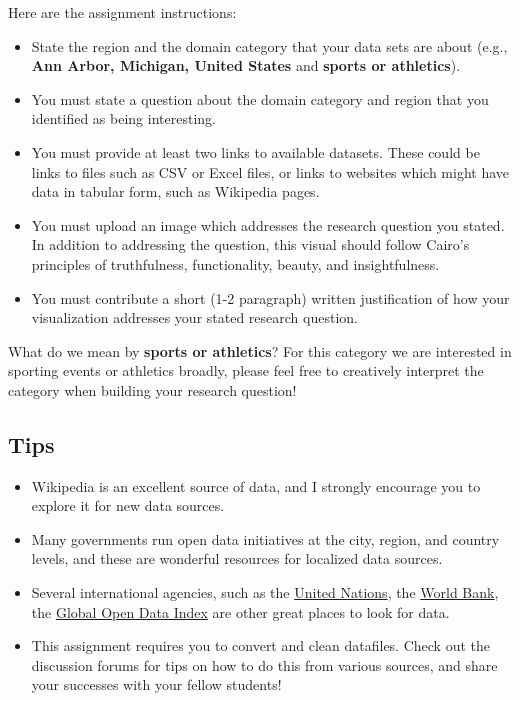 \documentclass[11pt]{article}
\providecommand{\tightlist}{%
      \setlength{\itemsep}{0pt}\setlength{\parskip}{0pt}}
\begin{document}
Here are the assignment instructions:

\begin{itemize}
\tightlist
\item
  State the region and the domain category that your data sets are about
  (e.g., \textbf{Ann Arbor, Michigan, United States} and \textbf{sports
  or athletics}).
\item
  You must state a question about the domain category and region that
  you identified as being interesting.
\item
  You must provide at least two links to available datasets. These could
  be links to files such as CSV or Excel files, or links to websites
  which might have data in tabular form, such as Wikipedia pages.
\item
  You must upload an image which addresses the research question you
  stated. In addition to addressing the question, this visual should
  follow Cairo's principles of truthfulness, functionality, beauty, and
  insightfulness.
\item
  You must contribute a short (1-2 paragraph) written justification of
  how your visualization addresses your stated research question.
\end{itemize}

What do we mean by \textbf{sports or athletics}? For this category we
are interested in sporting events or athletics broadly, please feel free
to creatively interpret the category when building your research
question!

\subsection{Tips}\label{tips}

\begin{itemize}
\tightlist
\item
  Wikipedia is an excellent source of data, and I strongly encourage you
  to explore it for new data sources.
\item
  Many governments run open data initiatives at the city, region, and
  country levels, and these are wonderful resources for localized data
  sources.
\item
  Several international agencies, such as the
  \href{http://data.un.org/}{United Nations}, the
  \href{http://data.worldbank.org/}{World Bank}, the
  \href{http://index.okfn.org/place/}{Global Open Data Index} are other
  great places to look for data.
\item
  This assignment requires you to convert and clean datafiles. Check out
  the discussion forums for tips on how to do this from various sources,
  and share your successes with your fellow students!
\end{itemize}
\end{document}
